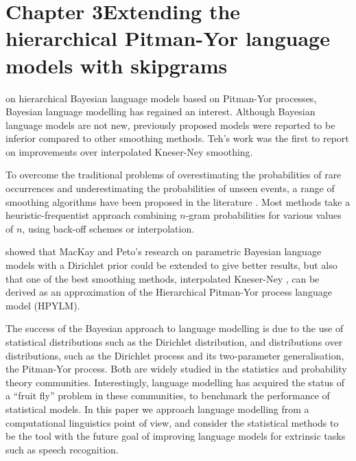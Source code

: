 \chapter{Chapter 3\newline Extending the hierarchical Pitman-Yor language models with skipgrams}\label{chap:shpyplm}


 on hierarchical Bayesian language models based on Pitman-Yor processes\cite{teh2006hierarchical}, Bayesian language modelling has regained an interest. Although Bayesian language models are not new\cite{mackay1995hierarchical}, previously proposed models were reported to be inferior compared to other smoothing methods. Teh's work was the first to report on improvements over interpolated Kneser-Ney smoothing\cite{teh2006hierarchical}.
    
  To overcome the traditional problems of overestimating the probabilities of rare occurrences and underestimating the probabilities of unseen events, a range of smoothing algorithms have been proposed in the literature \cite{goodman2001bit}. Most methods take a heuristic-frequentist approach combining $n$-gram probabilities for various values of $n$, using back-off schemes or interpolation. 

\textcite{teh2006hierarchical} showed that MacKay and Peto's \citep{mackay1995hierarchical} research on parametric Bayesian language models with a Dirichlet prior could be extended to give better results, but also that one of the best smoothing methods, interpolated Kneser-Ney \cite{kneser1995improved}, can be derived as an approximation of the Hierarchical Pitman-Yor process language model (HPYLM).
  
  The success of the Bayesian approach to language modelling is due to the use of statistical distributions such as the Dirichlet distribution, and distributions over distributions, such as the Dirichlet process and its two-parameter generalisation, the Pitman-Yor process. Both are widely studied in the statistics and probability theory communities. Interestingly, language modelling has acquired the status of a ``fruit fly'' problem in these communities, to benchmark the performance of statistical models. In this paper we approach language modelling from a computational linguistics point of view, and consider the statistical methods to be the tool with the future goal of improving language models for extrinsic tasks such as speech recognition.
  
